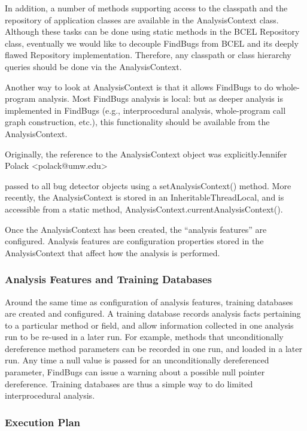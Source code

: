 \documentclass[11pt]{article}
\begin{document}
In addition, a number of methods supporting access to the classpath and the
repository of application classes are available in the AnalysisContext class.
Although these tasks can be done using static methods in the BCEL
Repository class, eventually we would like to decouple FindBugs from BCEL
and its deeply flawed Repository implementation.  Therefore, any classpath
or class hierarchy queries should be done via the AnalysisContext.

Another way to look at AnalysisContext is that it allows FindBugs to do
whole-program analysis.  Most FindBugs analysis is local: but as deeper
analysis is implemented in FindBugs (e.g., interprocedural analysis,
whole-program call graph construction, etc.), this functionality should
be available from the AnalysisContext.

Originally, the reference to the AnalysisContext object was explicitlyJennifer Polack <polack@umw.edu>

passed to all bug detector objects using a setAnalysisContext() method.
More recently, the AnalysisContext is stored in an InheritableThreadLocal, and is accessible
from a static method, AnalysisContext.currentAnalysisContext().

Once the AnalysisContext has been created, the ``analysis features'' are configured.
Analysis features are configuration properties stored in the AnalysisContext that
affect how the analysis is performed.

\subsubsection{Analysis Features and Training Databases}

Around the same time as configuration of analysis features, training
databases are created and configured.  A training database records analysis facts
pertaining to a particular method or field, and allow information collected
in one analysis run to be re-used in a later run.  For example, methods that
unconditionally dereference method parameters can be recorded in one run,
and loaded in a later run.  Any time a null value is passed for an unconditionally
dereferenced parameter, FindBugs can issue a warning about a possible null pointer
dereference.  Training databases are thus a simple way to do limited interprocedural
analysis.

\subsubsection{Execution Plan}
\end{document}
